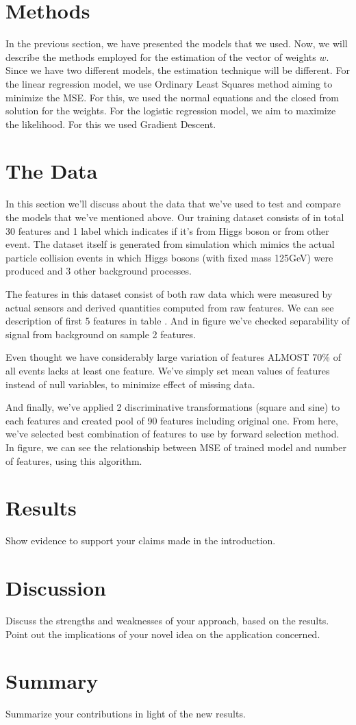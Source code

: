 \documentclass[10pt,conference,compsocconf]{IEEEtran}
\begin{document}
\section{Methods}
In the previous section, we have presented the models that we used. Now, we will describe the methods employed for the estimation of the vector of weights $w$. Since we have two different models, the estimation technique will be different. 
For the linear regression model, we use Ordinary Least Squares method aiming to minimize the MSE. For this, we used the normal equations and the closed from solution for the weights. 
For the logistic regression model, we aim to maximize the likelihood. For this we used Gradient Descent. 


\section{The Data}
\label{S1}
In this section we'll discuss about the data that we've used to test and compare the models that we've mentioned above. Our training dataset consists of in total 30 features and 1 label which indicates if it's from Higgs boson or from other event. The dataset itself is generated from simulation which mimics the actual particle collision events in which Higgs bosons (with fixed mass 125GeV) were produced and 3 other background processes. 

The features in this dataset consist of both raw data which were measured by actual sensors and derived quantities computed from raw features. We can see description of first 5 features in table {}. And in figure {} we've checked separability of signal from background on sample 2 features. 

Even thought we have considerably large variation of features ALMOST 70\% of all events lacks at least one feature. We've simply set mean values of features instead of null variables, to minimize effect of missing data. 

And finally, we've applied 2 discriminative transformations (square and sine) to each features and created pool of 90 features including original one. From here, we've selected best combination of features to use by forward selection method. In figure{}, we can see the relationship between MSE of trained model and number of features, using this algorithm.


\section{Results}
\label{S1}
  Show evidence to support your claims made in the
introduction.
\section{Discussion}
\label{S1}
  Discuss the strengths and weaknesses of your
approach, based on the results. Point out the implications of your
novel idea on the application concerned.
\section{Summary}
\label{S1}
  Summarize your contributions in light of the new
results.
\end{document}
